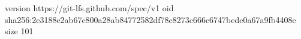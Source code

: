 version https://git-lfs.github.com/spec/v1
oid sha256:2e3188e2ab67c800a28ab84772582df78c8273c666c6747bede0a67a9fb4408e
size 101
